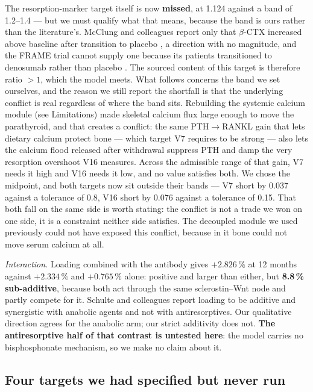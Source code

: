 \documentclass[10pt,letterpaper]{article}
\begin{document}
The resorption-marker target itself is now \textbf{missed}, at 1.124 against a
band of 1.2--1.4 --- but we must qualify what that means, because the band is
ours rather than the literature's. McClung and colleagues report only that
$\beta$-CTX increased above baseline after transition to placebo
\cite{mcclung2018}, a direction with no magnitude, and the FRAME trial cannot
supply one because its patients transitioned to denosumab rather than placebo
\cite{cosman2016}. The sourced content of this target is therefore ratio $> 1$,
which the model meets. What follows concerns the band we set ourselves, and the
reason we still report the shortfall is that the underlying conflict is real
regardless of where the band sits.
Rebuilding the systemic calcium module (see Limitations) made skeletal calcium
flux large enough to move the parathyroid, and that creates a conflict: the same
PTH$\rightarrow$RANKL gain that lets dietary calcium protect bone --- which
target V7 requires to be strong --- also lets the calcium flood released after
withdrawal suppress PTH and damp the very resorption overshoot V16 measures.
Across the admissible range of that gain, V7 needs it high and V16 needs it low,
and no value satisfies both. We chose the midpoint, and both targets now sit
outside their bands --- V7 short by 0.037 against a tolerance of 0.8, V16 short
by 0.076 against a tolerance of 0.15. That both fall on the same side is worth
stating: the conflict is not a trade we won on one side, it is a constraint
neither side satisfies. The
decoupled module we used previously could not have exposed this conflict,
because in it bone could not move serum calcium at all.

\emph{Interaction.} Loading combined with the antibody gives $+2.826\,\%$ at
12 months against $+2.334\,\%$ and $+0.765\,\%$ alone: positive and larger
than either, but \textbf{8.8\,\% sub-additive}, because both act through the
same sclerostin--Wnt node and partly compete for it. Schulte and colleagues
\cite{schulte2026} report loading to be additive and synergistic with anabolic
agents and not with antiresorptives. Our qualitative direction agrees for the
anabolic arm; our strict additivity does not. \textbf{The antiresorptive half
of that contrast is untested here}: the model carries no bisphosphonate
mechanism, so we make no claim about it.

\subsection*{Four targets we had specified but never run}
\end{document}
